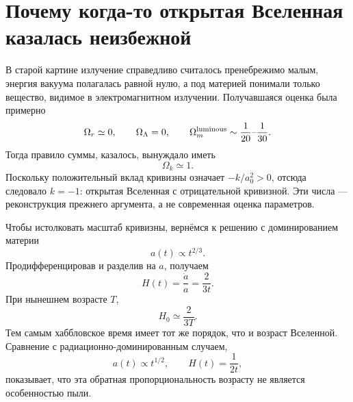 \begin{classroomqa}
\end{classroomqa}

\section{Почему когда-то открытая Вселенная казалась неизбежной}

В старой картине излучение справедливо считалось пренебрежимо малым, энергия вакуума полагалась равной нулю, а под материей понимали только вещество, видимое в электромагнитном излучении. Получавшаяся оценка была примерно
\begin{equation}
\Omega_r\simeq0,
\qquad
\Omega_\Lambda=0,
\qquad
\Omega_m^{\rm luminous}\sim\frac{1}{20}\text{--}\frac{1}{30}.
\end{equation}
Тогда правило суммы, казалось, вынуждало иметь
\begin{equation}
\Omega_k\simeq1.
\end{equation}
Поскольку положительный вклад кривизны означает \(-k/a_0^2>0\), отсюда следовало \(k=-1\): открытая Вселенная с отрицательной кривизной. Эти числа — реконструкция прежнего аргумента, а не современная оценка параметров.

Чтобы истолковать масштаб кривизны, вернёмся к решению с доминированием материи
\begin{equation}
a(t)\propto t^{2/3}.
\end{equation}
Продифференцировав и разделив на \(a\), получаем
\begin{equation}
H(t)=\frac{\dot a}{a}=\frac{2}{3t}.
\label{eq:c06-matter-h}
\end{equation}
При нынешнем возрасте \(T\),
\begin{equation}
H_0\simeq\frac{2}{3T}.
\end{equation}
Тем самым хаббловское время имеет тот же порядок, что и возраст Вселенной. Сравнение с радиационно-доминированным случаем,
\begin{equation}
a(t)\propto t^{1/2},
\qquad
H(t)=\frac{1}{2t},
\end{equation}
показывает, что эта обратная пропорциональность возрасту не является особенностью пыли.

